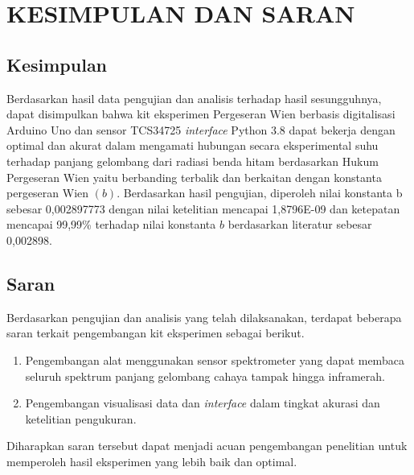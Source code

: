     \chapter{KESIMPULAN DAN SARAN}

\section{Kesimpulan}
Berdasarkan hasil data pengujian dan analisis terhadap hasil sesungguhnya, dapat disimpulkan bahwa kit eksperimen Pergeseran Wien berbasis digitalisasi Arduino Uno dan sensor TCS34725 \textit{interface} Python 3.8 dapat bekerja dengan optimal dan akurat dalam mengamati hubungan secara eksperimental suhu terhadap panjang gelombang dari radiasi benda hitam berdasarkan Hukum Pergeseran Wien yaitu berbanding terbalik dan berkaitan dengan konstanta pergeseran Wien $(b)$. Berdasarkan hasil pengujian, diperoleh nilai konstanta b sebesar 0,002897773 dengan nilai ketelitian mencapai 1,8796E-09 dan ketepatan mencapai 99,99\% terhadap nilai konstanta $b$ berdasarkan literatur sebesar 0,002898. 

\section{Saran}
Berdasarkan pengujian dan analisis yang telah dilaksanakan, terdapat beberapa saran terkait pengembangan kit eksperimen sebagai berikut.
\begin{enumerate}
    \item Pengembangan alat menggunakan sensor spektrometer yang dapat membaca seluruh spektrum panjang gelombang cahaya tampak hingga inframerah.
    \item Pengembangan visualisasi data dan \textit{interface} dalam tingkat akurasi dan ketelitian pengukuran.
\end{enumerate}
Diharapkan saran tersebut dapat menjadi acuan pengembangan penelitian untuk memperoleh hasil eksperimen yang lebih baik dan optimal.

